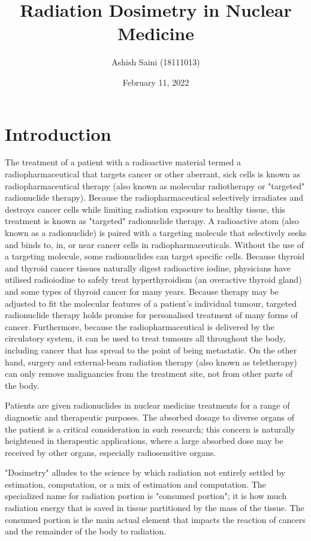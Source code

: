 \documentclass[12pt]{article}
\begin{document}
\title{Radiation Dosimetry in Nuclear Medicine}
\author{Ashish Saini (18111013)}
\date{February 11, 2022}
\maketitle


\section{Introduction}

The treatment of a patient with a radioactive material termed a radiopharmaceutical that targets cancer or other aberrant, sick cells is known as radiopharmaceutical therapy (also known as molecular radiotherapy or "targeted" radionuclide therapy). Because the radiopharmaceutical selectively irradiates and destroys cancer cells while limiting radiation exposure to healthy tissue, this treatment is known as "targeted" radionuclide therapy. A radioactive atom (also known as a radionuclide) is paired with a targeting molecule that selectively seeks and binds to, in, or near cancer cells in radiopharmaceuticals. Without the use of a targeting molecule, some radionuclides can target specific cells. Because thyroid and thyroid cancer tissues naturally digest radioactive iodine, physicians have utilised radioiodine to safely treat hyperthyroidism (an overactive thyroid gland) and some types of thyroid cancer for many years. Because therapy may be adjusted to fit the molecular features of a patient's individual tumour, targeted radionuclide therapy holds promise for personalised treatment of many forms of cancer. Furthermore, because the radiopharmaceutical is delivered by the circulatory system, it can be used to treat tumours all throughout the body, including cancer that has spread to the point of being metastatic. On the other hand, surgery and external-beam radiation therapy (also known as teletherapy) can only remove malignancies from the treatment site, not from other parts of the body.
\par
Patients are given radionuclides in nuclear medicine treatments for a range of diagnostic and therapeutic purposes. The absorbed dosage to diverse organs of the patient is a critical consideration in such research; this concern is naturally heightened in therapeutic applications, where a large absorbed dose may be received by other organs, especially radiosensitive organs. 
\par
"Dosimetry" alludes to the science by which radiation not entirely settled by estimation, computation, or a mix of estimation and computation. The specialized name for radiation portion is "consumed portion"; it is how much radiation energy that is saved in tissue partitioned by the mass of the tissue. The consumed portion is the main actual element that impacts the reaction of cancers and the remainder of the body to radiation.
\end{document}
